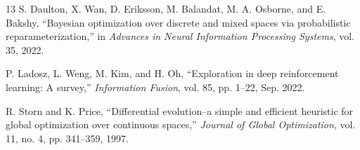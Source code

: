 \documentclass[letterpaper,journal]{IEEEtran}
\begin{document}
\begin{thebibliography}{13}
S. Daulton, X. Wan, D. Eriksson, M. Balandat, M. A. Osborne, and E. Bakshy, ``Bayesian optimization over discrete and mixed spaces via probabilistic reparameterization,'' in \emph{Advances in Neural Information Processing Systems}, vol. 35, 2022.

P. Ladosz, L. Weng, M. Kim, and H. Oh, ``Exploration in deep reinforcement learning: A survey,'' \emph{Information Fusion}, vol. 85, pp. 1--22, Sep. 2022.

R. Storn and K. Price, ``Differential evolution--a simple and efficient heuristic for global optimization over continuous spaces,'' \emph{Journal of Global Optimization}, vol. 11, no. 4, pp. 341--359, 1997.
\end{thebibliography}
\end{document}
